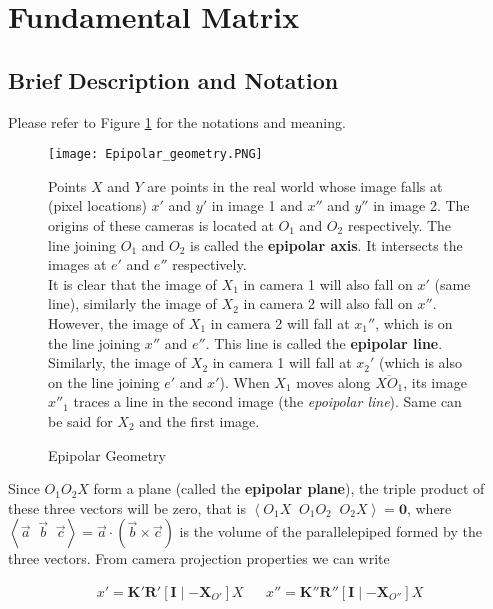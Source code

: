 \section{Fundamental Matrix}

\subsection*{Brief Description and Notation}

Please refer to Figure \ref{fig:q1-epipolar-geometry} for the notations and meaning.

\begin{figure}[h]
    \centering
    \texttt{[image: Epipolar\_geometry.PNG]}
    \caption{Epipolar Geometry}
    \label{fig:q1-epipolar-geometry}
    \small
        Points $X$ and $Y$ are points in the real world whose image falls at (pixel locations) $x'$ and $y'$ in image 1 and $x''$ and $y''$ in image 2. The origins of these cameras is located at $O_1$ and $O_2$ respectively. The line joining $O_1$ and $O_2$ is called the \textbf{epipolar axis}. It intersects the images at $e'$ and $e''$ respectively. \\
        It is clear that the image of $X_1$ in camera 1 will also fall on $x'$ (same line), similarly the image of $X_2$ in camera 2 will also fall on $x''$. However, the image of $X_1$ in camera 2 will fall at $x_1''$, which is on the line joining $x''$ and $e''$. This line is called the \textbf{epipolar line}. Similarly, the image of $X_2$ in camera 1 will fall at $x_2'$ (which is also on the line joining $e'$ and $x'$).
        When $X_1$ moves along $\overline{XO_1}$, its image $x''_1$ traces a line in the second image (the \textit{epoipolar line}). Same can be said for $X_2$ and the first image.
\end{figure}

Since $O_1 O_2 X$ form a plane (called the \textbf{epipolar plane}), the triple product of these three vectors will be zero, that is $\left \langle O_1 X \;\; O_1 O_2 \;\; O_2 X \right \rangle = \mathbf{0}$, where $\left \langle \vec{a} \;\; \vec{b} \;\; \vec{c} \right \rangle = \vec{a} \cdot \left ( \vec{b} \times \vec{c} \right )$ is the volume of the parallelepiped formed by the three vectors. From camera projection properties we can write

\begin{align}
    x' = \mathbf{K}' \mathbf{R}' \left [ \mathbf{I} \mid -\mathbf{X}_{O'} \right ] X
    &&
    x'' = \mathbf{K}'' \mathbf{R}'' \left [ \mathbf{I} \mid -\mathbf{X}_{O''} \right ] X
    \label{eq:q1-camera-projection}
\end{align}

